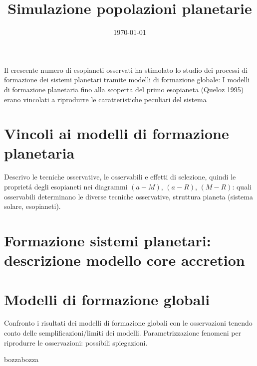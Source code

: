 \documentclass[twoside,11pt,fleqn]{memoir}%
\author{ }
\title{Simulazione popolazioni planetarie}
\date{\today}
\def\versione{bozza}%
\def\bozza{bozza}
\begin{document}
\maketitle
{}
\tableofcontents*
\mainmatter
{}
\cleartorecto
Il crescente numero di esopianeti osservati ha stimolato lo studio dei processi di formazione dei sistemi planetari tramite modelli di formazione globale: 
I modelli di formazione planetaria fino alla scoperta del primo esopianeta (Queloz 1995) erano vincolati a riprodurre le caratteristiche peculiari del sistema

{\let\clearpage\relax\let\cleardoublepage\relax
\part{Vincoli ai modelli di formazione planetaria}
}
Descrivo le tecniche osservative, le osservabili e effetti di selezione, quindi le propriet\'a degli esopianeti nei diagrammi $(a-M)$, $(a-R)$, $(M-R)$: quali osservabili determinano le diverse tecniche osservative, struttura pianeta (sistema solare, esopianeti).

\cleartorecto

{\let\clearpage\relax\let\cleardoublepage\relax
\part{Formazione sistemi planetari: descrizione modello core accretion}\label{part:CAdesc}
}

\cleartorecto

{\let\clearpage\relax\let\cleardoublepage\relax
\part{Modelli di formazione globali}
}
Confronto i risultati dei modelli di formazione globali con le osservazioni tenendo conto delle semplificazioni/limiti dei modelli. Parametrizzazione fenomeni per riprodurre le osservazioni: possibili spiegazioni.

\cleartorecto



{\let\clearpage\relax\let\cleardoublepage\relax
\backmatter
}
%
\printbibliography
\ifx\versione\bozza
\woc
\erratac
\fi
\end{document}
